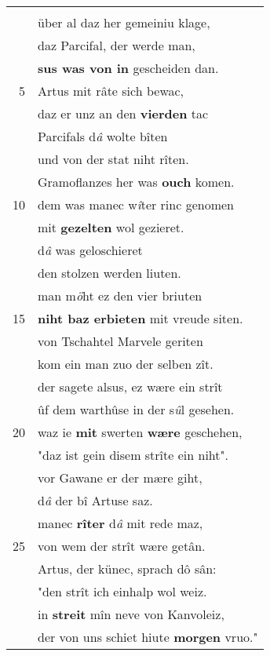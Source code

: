 \documentclass[8pt,a4paper,notitlepage]{article}
\begin{document}
\begin{table}[ht]
\begin{minipage}[t]{0.5\linewidth}
\begin{center}
\end{center}
\begin{tabular}{rl}
 & \textbf{\begin{large}D\end{large}ô} was bî dem selben tage\\ 
 & über al daz her gemeiniu klage,\\ 
 & daz Parcifal, der werde man,\\ 
 & \textbf{sus was von in} gescheiden dan.\\ 
5 & Artus mit râte sich bewac,\\ 
 & daz er unz an den \textbf{vierden} tac\\ 
 & Parcifals d\textit{â} wolte bîten\\ 
 & und von der stat niht rîten.\\ 
 & Gramoflanzes her was \textbf{ouch} komen.\\ 
10 & dem was manec w\textit{î}ter rinc genomen\\ 
 & mit \textbf{gezelten} wol gezieret.\\ 
 & d\textit{â} was geloschieret\\ 
 & den stolzen werden liuten.\\ 
 & man m\textit{ö}ht ez den vier briuten\\ 
15 & \textbf{niht baz erbieten} mit vreude siten.\\ 
 & von Tschahtel Marvele geriten\\ 
 & kom ein man zuo der selben zît.\\ 
 & der sagete alsus, ez wære ein strît\\ 
 & ûf dem warthûse in der s\textit{û}l gesehen.\\ 
20 & waz ie \textbf{mit} swerten \textbf{wære} geschehen,\\ 
 & "daz ist gein disem strîte ein niht".\\ 
 & vor Gawane er der mære giht,\\ 
 & d\textit{â} der bî Artuse saz.\\ 
 & manec \textbf{rîter} d\textit{â} mit rede maz,\\ 
25 & von wem der strît wære getân.\\ 
 & Artus, der künec, sprach dô sân:\\ 
 & "den strît ich einhalp wol weiz.\\ 
 & in \textbf{streit} mîn neve von Kanvoleiz,\\ 
 & der von uns schiet hiute \textbf{morgen} vruo."\\ 

\end{tabular}
\end{minipage}
\end{table}
\end{document}
